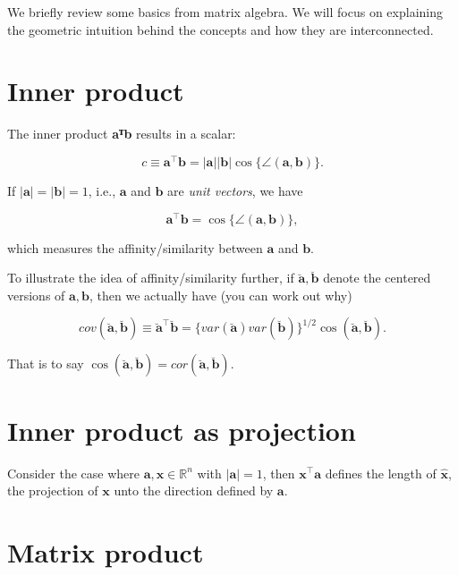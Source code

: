 \documentclass[
]{book}
\begin{document}
We briefly review some basics from matrix algebra. We will focus on explaining the geometric intuition behind the concepts and how they are interconnected.

\section{Inner product}\label{inner-product}

The inner product \textbf{aᵀb} results in a scalar:

\[ 
c \equiv \mathbf{a}^\top \mathbf{b} = \lvert \mathbf{a} \rvert \lvert \mathbf{b} \rvert \cos \{ \angle(\mathbf{a}, \mathbf{b}) \}.
\]

If \(\lvert \mathbf{a} \rvert =  \lvert \mathbf{b} \rvert  = 1\), i.e., \(\mathbf{a}\) and \(\mathbf{b}\) are \emph{unit vectors}, we have

\[
\mathbf{a}^\top \mathbf{b} = \cos \{ \angle(\mathbf{a}, \mathbf{b}) \},
\]

which measures the affinity/similarity between \(\mathbf{a}\) and \(\mathbf{b}\).

To illustrate the idea of affinity/similarity further, if \(\breve{\mathbf{a}}, \breve{\mathbf{b}}\) denote the centered versions of \(\mathbf{a}, \mathbf{b}\), then we actually have (you can work out why)

\[
cov(\breve{\mathbf{a}}, \breve{\mathbf{b}}) \equiv \breve{\mathbf{a}}^\top \breve{\mathbf{b}} = \{var(\breve{\mathbf{a}})var(\breve{\mathbf{b}})\}^{1/2} \cos(\breve{\mathbf{a}}, \breve{\mathbf{b}}).
\]

That is to say \(\cos(\breve{\mathbf{a}}, \breve{\mathbf{b}}) = cor(\breve{\mathbf{a}}, \breve{\mathbf{b}})\).

\section{Inner product as projection}\label{inner-product-as-projection}

Consider the case where \(\mathbf{a}, \mathbf{x} \in \mathbb{R}^n\) with \(\lvert \mathbf{a}\rvert = 1\), then \(\mathbf{x}^\top \mathbf{a}\) defines the length of \(\hat{\mathbf{x}}\), the projection of \(\mathbf{x}\) unto the direction defined by \(\mathbf{a}\).

\section{Matrix product}\label{matrix-product}
\end{document}

